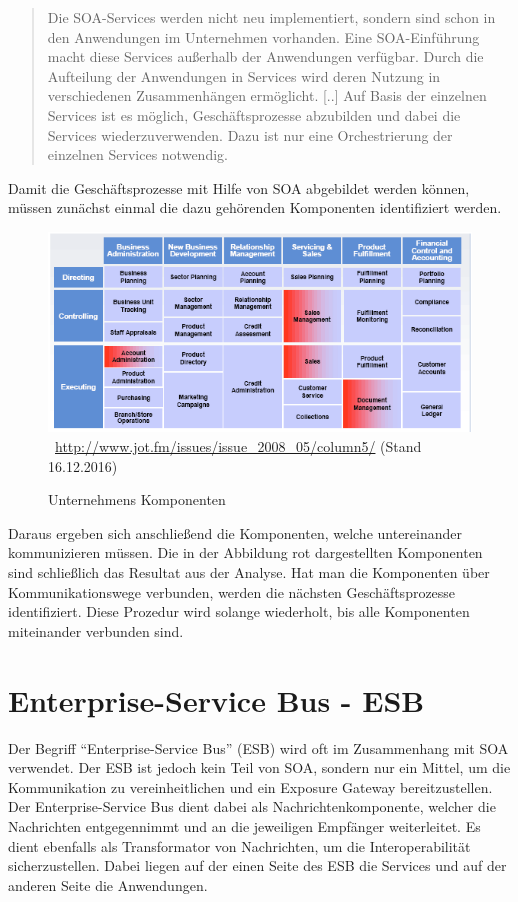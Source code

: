 \begin{quotation}
	\frqq Die SOA-Services werden nicht neu implementiert, sondern sind schon in den Anwendungen im Unternehmen vorhanden. Eine SOA-Einführung macht diese Services außerhalb der Anwendungen verfügbar. Durch die Aufteilung der Anwendungen in Services wird deren Nutzung in verschiedenen Zusammenhängen ermöglicht. [..] Auf Basis der einzelnen Services ist es möglich, Geschäftsprozesse abzubilden und dabei die Services wiederzuverwenden. Dazu ist nur eine Orchestrierung der einzelnen Services notwendig.\flqq\ \cite[S. 84]{EWolff2016:Microservices}
\end{quotation}

Damit die Geschäftsprozesse mit Hilfe von SOA abgebildet werden können, müssen zunächst einmal die dazu gehörenden Komponenten identifiziert werden.

\begin{figure}[htb]
    \centering 
    \includegraphics[width=\linewidth]{content/images/UnternehmensKomponenten}\
    \quelle\url{http://www.jot.fm/issues/issue_2008_05/column5/} (Stand 16.12.2016)
    \caption[Unternehmens Komponenten]{Unternehmens Komponenten\\}
    \label{fig:UnternehmensKomponenten}  
\end{figure} 
\newpage
Daraus ergeben sich anschließend die Komponenten, welche untereinander kommunizieren müssen. Die in der Abbildung rot dargestellten Komponenten sind schließlich das Resultat aus der Analyse. Hat man die Komponenten über Kommunikationswege verbunden, werden die nächsten Geschäftsprozesse identifiziert. Diese Prozedur wird solange wiederholt, bis alle Komponenten miteinander verbunden sind.

\section{Enterprise-Service Bus - ESB}
\label{sec:esb}
Der Begriff "`Enterprise-Service Bus"' (ESB) wird oft im Zusammenhang mit SOA verwendet. Der ESB ist jedoch kein Teil von SOA, sondern nur ein Mittel, um die Kommunikation zu vereinheitlichen und ein Exposure Gateway bereitzustellen. Der Enterprise-Service Bus dient dabei als Nachrichtenkomponente, welcher die Nachrichten entgegennimmt und an die jeweiligen Empfänger weiterleitet. Es dient ebenfalls als Transformator von Nachrichten, um die Interoperabilität sicherzustellen. Dabei liegen auf der einen Seite des ESB die Services und auf der anderen Seite die Anwendungen.

